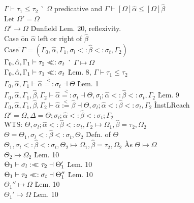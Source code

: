 \documentclass {article}
\newcommand{\alphahat}{\hat{\alpha}}
\newcommand{\betahat}{\hat{\beta}}
\newcommand{\instl}{\overset{<}{:=}}
\newcommand{\sigbndl}{:<\hspace{-5px}<}
\newcommand{\sigbndr}{<\hspace{-5px}<:}
\newcommand{\siginstr}{\overset{\overline{<}}{=:}}
\newcommand{\tst}{{\scriptstyle{<:}}}
\newcommand{\bound}[3]{#1 \tst #2 \tst #3}
\newcommand{\ctxmapto}{\longmapsto}
\begin{document}
\begin{tabbing}
\> $\Gamma \vdash \tau_1 \leq \tau_2$ 									\` $\Omega$ predicative and $\Gamma \vdash [\Omega]\alphahat \leq [\Omega]\betahat$\\
\> Let $\Omega' = \Omega$\\
\> $\Omega' \longrightarrow \Omega$ 									\` Dunfield Lem. 20, reflexivity.\\
\> Case \=on $\alphahat$ left or right of $\betahat$\\
\>\>Case \=$\Gamma = (\Gamma_0,\alphahat,\Gamma_1,\bound{\sigma_l}{\betahat}{\sigma_t},\Gamma_2)$\\
\>\>\>$\Gamma_0,\alphahat,\Gamma_1 \vdash \tau_2 \sigbndr \sigma_t$		\` $\Gamma \mapsto \Omega$\\
\>\>\>$\Gamma_0,\alphahat,\Gamma_1 \vdash \tau_1 \sigbndr \sigma_t$		\` Lem. 8, $\Gamma \vdash \tau_1 \leq \tau_2$\\
\>\>\>$\Gamma_0,\alphahat,\Gamma_1 \vdash \alphahat \siginstr \sigma_t \dashv \Theta$	\` Lem. 1\\
\>\>\>$\Gamma_0,\alphahat,\Gamma_1,\betahat,\Gamma_2 \vdash \alphahat \siginstr \sigma_t \dashv \Theta,\bound{\sigma_l;\alphahat}{\betahat}{\sigma_t},\Gamma_2$	\` Lem. 9\\
\>\>\>$\Gamma_0,\alphahat,\Gamma_1,\betahat,\Gamma_2 \vdash \alphahat \instl \betahat \dashv \Theta,\bound{\sigma_l;\alphahat}{\betahat}{\sigma_t},\Gamma_2$	\` InstLReach\\
\>\>\>$\Omega' = \Omega, \Delta = \Theta;\bound{\sigma_l;\alphahat}{\betahat}{\sigma_t};\Gamma_2$\\
\>\>\>WTS: $\Theta,\bound{\sigma_l;\alphahat}{\betahat}{\sigma_t},\Gamma_2 \ctxmapto \Omega_1,\betahat=\tau_2,\Omega_2$\\
\>\>\>$\Theta = \Theta_1,\bound{\sigma_l}{\betahat}{\sigma_t},\Theta_2$ \` Defn. of $\Theta$\\
\>\>\>$\Theta_1,\bound{\sigma_l}{\betahat}{\sigma_t},\Theta_2 \ctxmapto \Omega_1,\betahat = \tau_2,\Omega_2$ \` As $\Theta \ctxmapto \Omega$\\
\>\>\> $\Theta_2 \ctxmapto \Omega_2$ 										\` Lem. 10\\
\>\>\> $\Theta_1 \vdash \sigma_l \sigbndl \tau_2 \dashv \Theta_1'$ 			\` Lem. 10\\
\>\>\> $\Theta_1 \vdash \tau_2 \sigbndr \sigma_t \dashv \Theta_1''$ 		\` Lem. 10\\
\>\>\> $\Theta_1''\ctxmapto\Omega$ 											\` Lem. 10\\
\>\>\> $\Theta_1'\ctxmapto\Omega$ 											\` Lem. 10\\

\end{tabbing}
\end{document}
